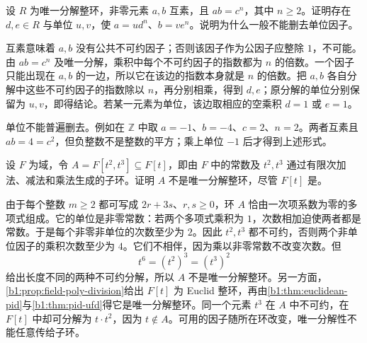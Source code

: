 \begin{exercise}\label{b1:ex:11-coprime-powers}
	设 \(R\) 为唯一分解整环，非零元素 \(a,b\) 互素，且 \(ab=c^n\)，其中 \(n\geq2\)。证明存在 \(d,e\in R\) 与单位 \(u,v\)，使 \(a=ud^n\)、\(b=ve^n\)。说明为什么一般不能删去单位因子。
\end{exercise}
\begin{solution}
	互素意味着 \(a,b\) 没有公共不可约因子；否则该因子作为公因子应整除 \(1\)，不可能。由 \(ab=c^n\) 及唯一分解，乘积中每个不可约因子的指数都为 \(n\) 的倍数。一个因子只能出现在 \(a,b\) 的一边，所以它在该边的指数本身就是 \(n\) 的倍数。把 \(a,b\) 各自分解中这些不可约因子的指数除以 \(n\)，再分别相乘，得到 \(d,e\)；原分解的单位分别保留为 \(u,v\)，即得结论。若某一元素为单位，该边取相应的空乘积 \(d=1\) 或 \(e=1\)。

	单位不能普遍删去。例如在 \(\mathbb Z\) 中取 \(a=-1\)、\(b=-4\)、\(c=2\)、\(n=2\)。两者互素且 \(ab=4=c^2\)，但负整数不是整数的平方；乘上单位 \(-1\) 后才得到上述形式。
\end{solution}

\begin{exercise}\label{b1:ex:11-cusp-subring}
	设 \(F\) 为域，令 \(A=F[t^2,t^3]\subseteq F[t]\)，即由 \(F\) 中的常数及 \(t^2,t^3\) 通过有限次加法、减法和乘法生成的子环。证明 \(A\) 不是唯一分解整环，尽管 \(F[t]\) 是。
\end{exercise}
\begin{solution}
	由于每个整数 \(m\geq2\) 都可写成 \(2r+3s\)、\(r,s\geq0\)，环 \(A\) 恰由一次项系数为零的多项式组成。它的单位是非零常数：若两个多项式乘积为 \(1\)，次数相加迫使两者都是常数。于是每个非零非单位的次数至少为 \(2\)。因此 \(t^2,t^3\) 都不可约，否则两个非单位因子的乘积次数至少为 \(4\)。它们不相伴，因为乘以非零常数不改变次数。但
	\[
		t^6=(t^2)^3=(t^3)^2
	\]
	给出长度不同的两种不可约分解，所以 \(A\) 不是唯一分解整环。另一方面，\cref{b1:prop:field-poly-division}给出 \(F[t]\) 为 Euclid 整环，再由\cref{b1:thm:euclidean-pid}与\cref{b1:thm:pid-ufd}得它是唯一分解整环。同一个元素 \(t^3\) 在 \(A\) 中不可约，在 \(F[t]\) 中却可分解为 \(t\cdot t^2\)，因为 \(t\notin A\)。可用的因子随所在环改变，唯一分解性不能任意传给子环。
\end{solution}

